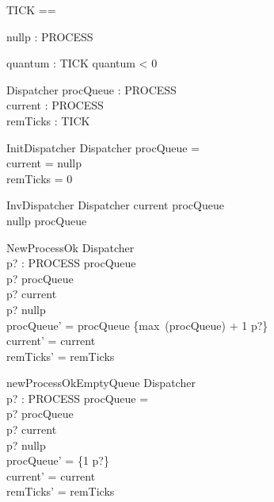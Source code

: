 \begin{zed}
    [PROCESS]
\also
    TICK == \nat
\end{zed}

\begin{axdef}
    nullp : PROCESS
\end{axdef}

\begin{axdef}
    quantum : TICK
\where
    quantum < 0
\end{axdef}

\begin{schema}{Dispatcher}
    procQueue : \nat \pinj PROCESS \\
    current : PROCESS \\
    remTicks : TICK
\end{schema}

\begin{schema}{InitDispatcher}
    Dispatcher
\where
    procQueue = \emptyset \\
    current = nullp \\
    remTicks = 0
\end{schema}

\begin{schema}{InvDispatcher}
    Dispatcher
\where
    current \notin \ran procQueue \\
    nullp \notin \ran procQueue
\end{schema}

\begin{schema}{NewProcessOk}
    \Delta Dispatcher \\
    p? : PROCESS
\where
    procQueue \neq \emptyset \\
    p? \notin \ran procQueue \\
    p? \neq current \\
    p? \neq nullp \\
    procQueue' = procQueue \cup \{max~(\dom procQueue) + 1 \mapsto p?\} \\
    current' = current \\
    remTicks' = remTicks
\end{schema}

\begin{schema}{newProcessOkEmptyQueue}
    \Delta Dispatcher \\
    p? : PROCESS
\where
    procQueue = \emptyset \\
    p? \notin \ran procQueue \\
    p? \neq current \\
    p? \neq nullp \\
    procQueue' = \{1 \mapsto p?\} \\
    current' = current \\
    remTicks' = remTicks
\end{schema}

